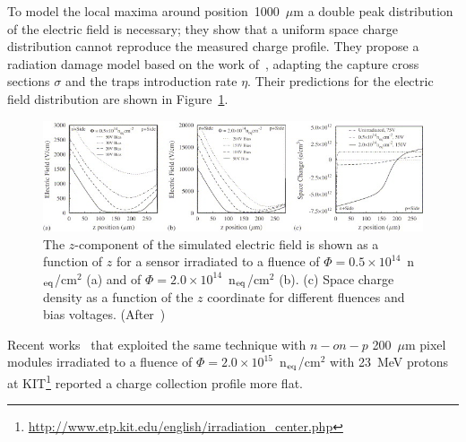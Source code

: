 To model the local maxima around position~1000~$\mu$m a double peak distribution of  the electric 
field is necessary; they show that a uniform space charge distribution cannot reproduce the 
measured charge profile. 
They propose a radiation damage model based on the work of~\cite{bib:DP}, adapting the 
capture cross sections $\sigma$ and the traps introduction rate $\eta$. Their predictions for the electric field distribution 
are shown in Figure~\ref{fig:chiochia2006_field_profiles}.


\begin{figure}[!htpb]
\centering
\includegraphics[width=1.00\textwidth]{chiochia2006_field_profiles.jpg}
\caption{\label{fig:chiochia2006_field_profiles}The $z$-component of the simulated electric field  is shown as a function of $z$ for a sensor irradiated to a fluence of  $\Phi = 0.5\times10^{14}$~n$_{\rm eq}$/cm$^2$  (a) and of $\Phi = 2.0\times10^{14}$~n$_{\rm eq}$/cm$^2$  (b).  (c) Space charge density as a function of the $z$ coordinate for different fluences and bias voltages. (After~\cite{CHIOCHIA2006})}
\end{figure}

Recent works~\cite{Macchiolo:2016xzi} that exploited the same technique with 
$n-on-p$ 200~$\mu$m pixel modules irradiated to a fluence of 
$\Phi = 2.0\times10^{15}$~n$_{\rm eq}$/cm$^2$ with 23~MeV protons at 
KIT\footnote{\url{http://www.etp.kit.edu/english/irradiation_center.php}} reported a charge collection 
profile more flat. 

